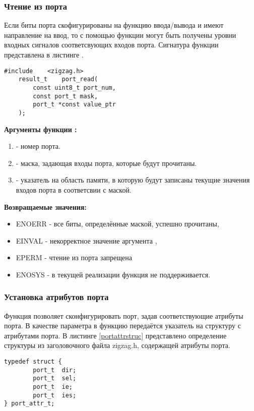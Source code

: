 \subsubsection{Чтение из порта}
    Если биты порта скофигурированы на функцию ввода/вывода и имеют направление на ввод,
то с помощью функции  могут быть получены уровни входных сигналов
соответсвующих входов порта. Сигнатура функции представлена в листинге .
\begin{lstlisting}[caption=\myfunc{port\_read()} - чтение из порта, label=portreadfunc ]
    #include    <zigzag.h>
    result_t    port_read( 
        const uint8_t port_num, 
        const port_t mask, 
        port_t *const value_ptr
    );
\end{lstlisting}

{\bfseries Аргументы функции :}

{\itshape
\begin{enumerate}
\item {} - номер порта.
\item {} - маска, задающая входы порта, которые будут прочитаны.
\item {} - указатель на область памяти, в которую будут записаны текущие значения
входов порта в соответсвии с маской.
\end{enumerate}
}

{\bfseries Возвращаемые значения:}

{\itshape
\begin{itemize}
\item ENOERR - все биты, определённые маской, успешно прочитаны,
\item EINVAL - некорректное значение аргумента ,
\item EPERM - чтение из порта запрещена
\item ENOSYS - в текущей реализации функция не поддерживается.
\end{itemize}
}

\subsubsection{Установка атрибутов порта}
    Функция  позволяет сконфигурировать порт, задав соответствующие атрибуты
порта. В качестве параметра в функцию  передаётся указатель на структуру с атрибутами
порта. В листинге \ref{portattrstruc} представлено определение структуры из заголовочного файла zigzag.h, 
содержащей атрибуты порта.
\begin{lstlisting}[caption=Определение структуры \myarg{port\_attr\_t}, label=portattrstruc ]
    typedef struct {
        port_t  dir;
        port_t  sel;
        port_t  ie;
        port_t  ies;
} port_attr_t;
\end{lstlisting}

